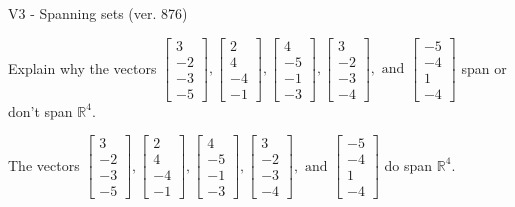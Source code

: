 \begin{exercise}
  \begin{exerciseTitle}V3 - Spanning sets (ver. 876)\end{exerciseTitle}
  \begin{exerciseStatement}
    Explain why the vectors \(\left[\begin{array}{r}
3 \\
-2 \\
-3 \\
-5
\end{array}\right] , \left[\begin{array}{r}
2 \\
4 \\
-4 \\
-1
\end{array}\right] , \left[\begin{array}{r}
4 \\
-5 \\
-1 \\
-3
\end{array}\right] , \left[\begin{array}{r}
3 \\
-2 \\
-3 \\
-4
\end{array}\right] , \text{ and } \left[\begin{array}{r}
-5 \\
-4 \\
1 \\
-4
\end{array}\right]\) span or don't span \(\mathbb{R}^4\). 
	


  \end{exerciseStatement}
  \begin{exerciseAnswer}
   The vectors \(\left[\begin{array}{r}
3 \\
-2 \\
-3 \\
-5
\end{array}\right] , \left[\begin{array}{r}
2 \\
4 \\
-4 \\
-1
\end{array}\right] , \left[\begin{array}{r}
4 \\
-5 \\
-1 \\
-3
\end{array}\right] , \left[\begin{array}{r}
3 \\
-2 \\
-3 \\
-4
\end{array}\right] , \text{ and } \left[\begin{array}{r}
-5 \\
-4 \\
1 \\
-4
\end{array}\right]\) 
  	 do  
	span \(\mathbb{R}^4\).
  



\end{exerciseAnswer}
\end{exercise}
